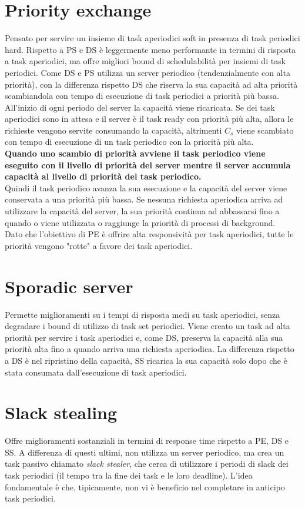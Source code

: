\documentclass[12pt,openany,onesided]{book}
\begin{document}
\section{Priority exchange}
\label{sec:priorityExchange}
Pensato per servire un insieme di task aperiodici soft in presenza di task periodici hard.
Rispetto a PS e DS è leggermente meno performante in termini di risposta a task aperiodici, ma offre migliori bound di schedulabilità per insiemi di task periodici.
Come DS e PS utilizza un server periodico (tendenzialmente con alta priorità), con la differenza rispetto DS che riserva la sua capacità ad alta priorità scambiandola con tempo di esecuzione di task periodici a priorità più bassa.
All'inizio di ogni periodo del server la capacità viene ricaricata. Se dei task aperiodici sono in attesa e il server è il task ready con priorità più alta, allora le richieste vengono servite consumando la capacità, altrimenti $C_s$ viene scambiato con tempo di esecuzione di un task periodico con la priorità più alta.
\\
\textbf{Quando uno scambio di priorità avviene il task periodico viene eseguito con il livello di priorità del server mentre il server accumula capacità al livello di priorità del task
periodico.}\\
Quindi il task periodico avanza la sua esecuzione e la capacità del server viene conservata a una priorità più bassa.
Se nessuna richiesta aperiodica arriva ad utilizzare la capacità del server, la sua priorità continua ad abbassarsi fino a quando o viene utilizzata o raggiunge la priorità di processi di background.
\\
Dato che l'obiettivo di PE è offrire alta responsività per task aperiodici, tutte le priorità vengono "rotte" a favore dei task aperiodici.
\section{Sporadic server}
\label{sec:sporadicServer}
Permette miglioramenti su i tempi di risposta medi su task aperiodici, senza degradare i bound di utilizzo di task set periodici.
Viene creato un task ad alta priorità per servire i task aperiodici e, come DS, preserva la capacità alla sua priorità alta fino a quando arriva una richiesta aperiodica.
La differenza rispetto a DS è nel ripristino della capacità, SS ricarica la sua capacità solo dopo che è stata consumata dall'esecuzione di task aperiodici.
\section{Slack stealing}
\label{sec:slackStealing}
Offre miglioramenti sostanziali in termini di response time rispetto a PE, DS e SS.
A differenza di questi ultimi, non utilizza un server periodico, ma crea un task passivo chiamato \textit{slack stealer},
che cerca di utilizzare i periodi di slack dei task periodici (il tempo tra la fine dei task e le loro deadline).
L'idea fondamentale è che, tipicamente, non vi è beneficio nel completare in anticipo task periodici.
\end{document}
